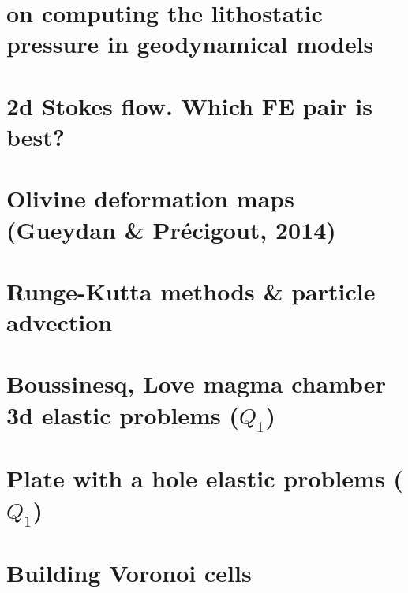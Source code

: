 \documentclass[a4paper,11pt]{report}
\begin{document}
\chapter{on computing the lithostatic pressure in geodynamical models \label{f119}} %

\chapter{2d Stokes flow. Which FE pair is best? \label{f120}} %

\chapter{Olivine deformation maps (Gueydan \& Pr{\'e}cigout, 2014)  \label{f121}} %

\chapter{Runge-Kutta methods \& particle advection \label{f122}}%

\chapter{Boussinesq, Love magma chamber 3d elastic problems ($Q_1$)\label{f123}} %

\chapter{Plate with a hole elastic problems ($Q_1$)\label{f124}} %

\chapter{Building Voronoi cells \label{f125}} %
\end{document}

